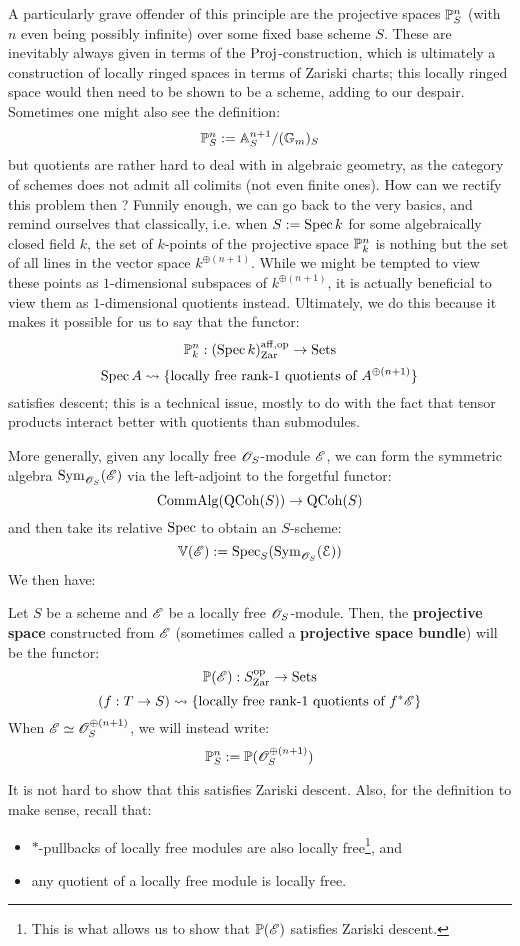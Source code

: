             A particularly grave offender of this principle are the projective spaces $\P^n_S$ (with $n$ even being possibly infinite) over some fixed base scheme $S$. These are inevitably always given in terms of the $\Proj$-construction, which is ultimately a construction of locally ringed spaces in terms of Zariski charts; this locally ringed space would then need to be shown to be a scheme, adding to our despair. Sometimes one might also see the definition:
                $$\P^n_S := \A^{n + 1}_S/(\G_m)_S$$
            but quotients are rather hard to deal with in algebraic geometry, as the category of schemes does not admit all colimits (not even finite ones). How can we rectify this problem then ? Funnily enough, we can go back to the very basics, and remind ourselves that classically, i.e. when $S := \Spec k$ for some algebraically closed field $k$, the set of $k$-points of the projective space $\P^n_k$ is nothing but the set of all lines in the vector space $k^{\oplus (n + 1)}$. While we might be tempted to view these points as $1$-dimensional subspaces of $k^{\oplus (n + 1)}$, it is actually beneficial to view them as $1$-dimensional quotients instead. Ultimately, we do this because it makes it possible for us to say that the functor:
                $$\P^n_k: (\Spec k)_{\Zar}^{\aff, \op} \to \Sets$$
                $$\Spec A \mapsto \{ \text{locally free rank-$1$ quotients of $A^{\oplus (n + 1)}$} \}$$
            satisfies descent; this is a technical issue, mostly to do with the fact that tensor products interact better with quotients than submodules.
    
            More generally, given any locally free $\scrO_S$-module $\scrE$, we can form the symmetric algebra $\Sym_{\scrO_S}(\scrE)$ via the left-adjoint to the forgetful functor:
                $$\Comm\Alg(\QCoh(S)) \to \QCoh(S)$$
            and then take its relative $\Spec$ to obtain an $S$-scheme:
                $$\V(\scrE) := \Spec_S( \Sym_{\scrO_S}(\E) )$$
            We then have:
            \begin{definition}
                Let $S$ be a scheme and $\scrE$ be a locally free $\scrO_S$-module. Then, the \textbf{projective space} constructed from $\scrE$ (sometimes called a \textbf{projective space bundle}) will be the functor:
                    $$\P(\scrE): S_{\Zar}^{\op} \to \Sets$$
                    $$(f: T \to S) \mapsto \{ \text{locally free rank-$1$ quotients of $f^* \scrE$} \}$$
                When $\scrE \cong \scrO_S^{\oplus (n + 1)}$, we will instead write:
                    $$\P^n_S := \P(\scrO_S^{\oplus (n + 1)})$$
            \end{definition}
            It is not hard to show that this satisfies Zariski descent. Also, for the definition to make sense, recall that:
            \begin{itemize}
                \item $*$-pullbacks of locally free modules are also locally free\footnote{This is what allows us to show that $\P(\scrE)$ satisfies Zariski descent.}, and
                \item any quotient of a locally free module is locally free.
            \end{itemize}
    

